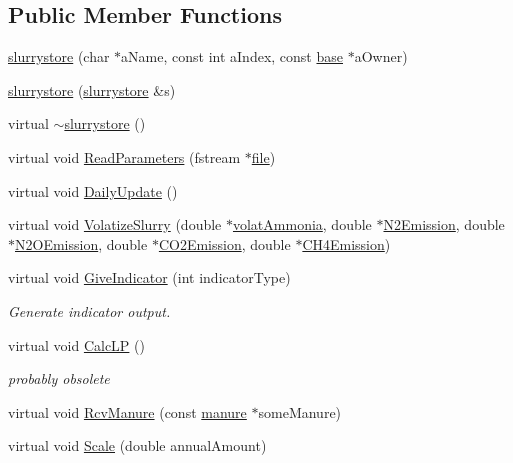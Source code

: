 \subsection*{Public Member Functions}
\begin{DoxyCompactItemize}
\item 
\hyperlink{classslurrystore_a57c19869f0be17c2dcf209918d75bb59}{slurrystore} (char $\ast$aName, const int aIndex, const \hyperlink{classbase}{base} $\ast$aOwner)
\item 
\hyperlink{classslurrystore_aa6fa3b3251ee847887d5e2a24e1453b9}{slurrystore} (\hyperlink{classslurrystore}{slurrystore} \&s)
\item 
virtual \hyperlink{classslurrystore_a167fb914f18444bb763597eed3928aa6}{$\sim$slurrystore} ()
\item 
virtual void \hyperlink{classslurrystore_a20975780b58214d7a091cbc2573c910c}{ReadParameters} (fstream $\ast$\hyperlink{classbase_a3af52ee9891719d09b8b19b42450b6f6}{file})
\item 
virtual void \hyperlink{classslurrystore_a0e660eb43b403bef8aaefb8188a73d4f}{DailyUpdate} ()
\item 
virtual void \hyperlink{classslurrystore_a6142751bab2ade200478ce49cc21dc2d}{VolatizeSlurry} (double $\ast$\hyperlink{classmanurestore_ac9d398e432684fb02bfaf52c2f0e9ae8}{volatAmmonia}, double $\ast$\hyperlink{classmanurestore_a9a8d525f55145b43f2ab275fb9b5f35f}{N2Emission}, double $\ast$\hyperlink{classmanurestore_aca5ad359219f1f6c9a957f03156136ab}{N2OEmission}, double $\ast$\hyperlink{classmanurestore_aebc6ae97114292e973c57cbc2ecc4f84}{CO2Emission}, double $\ast$\hyperlink{classmanurestore_ae472072caaaea49932fe2152e6a4fb09}{CH4Emission})
\item 
virtual void \hyperlink{classslurrystore_a982183d9d72019736bfdb792c4cb5d78}{GiveIndicator} (int indicatorType)
\begin{DoxyCompactList}\small\item\em Generate indicator output. \item\end{DoxyCompactList}\item 
virtual void \hyperlink{classslurrystore_a307b2de3fb81bd7adfa90335f6371816}{CalcLP} ()
\begin{DoxyCompactList}\small\item\em probably obsolete \item\end{DoxyCompactList}\item 
virtual void \hyperlink{classslurrystore_af99a5bbcf35c6845fcf989809c5347fa}{RcvManure} (const \hyperlink{classmanure}{manure} $\ast$someManure)
\item 
virtual void \hyperlink{classslurrystore_a72711544587a5024eeaa072c43a4840a}{Scale} (double annualAmount)
\end{DoxyCompactItemize}
